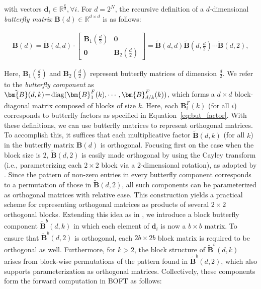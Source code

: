 with vectors $\bm{d}_i\in\mathbb{R}^{\frac{k}{2}}, \forall i$. For $d=2^N$, the recursive definition of a $d$-dimensional \emph{butterfly matrix} $\bm{B}(d)\in\mathbb{R}^{d\times d}$ is as follows:

\begin{equation}
\begin{aligned}
    \!\!\bm{B}(d)=\tilde{\bm{B}}(d,d)\!\cdot\!\begin{bmatrix}
    \bm{B}_1(\frac{d}{2})\!\!\!\!\! & \bm{0} \\
    \bm{0}\!\!\!\!\! &\bm{B}_2(\frac{d}{2})
    \end{bmatrix}= \tilde{\bm{B}}(d,d)\tilde{\bm{B}}(d,\frac{d}{2})\cdots\tilde{\bm{B}}(d,2),
\end{aligned}
\end{equation}

Here, $\bm{B}_1(\frac{d}{2})$ and $\bm{B}_2(\frac{d}{2})$ represent butterfly matrices of dimension $\frac{d}{2}$. We refer to the \emph{butterfly component} as $\thickmuskip=2mu \medmuskip=2mu \tilde{\bm{B}}(d,k)=\text{diag}(\bm{B}^F_1(k),\cdots,\bm{B}^F_{d/k}(k))$, which forms a $d\times d$ block-diagonal matrix composed of blocks of size $k$. Here, each $\bm{B}^F_i(k)$ (for all $i$) corresponds to butterfly factors as specified in Equation~\ref{eq:but_factor}. With these definitions, we can use butterfly matrices to represent orthogonal matrices. To accomplish this, it suffices that each multiplicative factor $\tilde{\bm{B}}(d,k)$ (for all $k$) in the butterfly matrix $\bm{B}(d)$ is orthogonal. Focusing first on the case when the block size is $2$, $\tilde{\bm{B}}(d,2)$ is easily made orthogonal by using the Cayley transform (i.e., parameterizing each $2\times 2$ block via a $2$-dimensional rotation), as adopted by \cite{liu2021orthogonal, qiu2023controlling}. Since the pattern of non-zero entries in every butterfly component corresponds to a permutation of those in $\tilde{\bm{B}}(d,2)$, all such components can be parameterized as orthogonal matrices with relative ease. This construction yields a practical scheme for representing orthogonal matrices as products of several $2\times 2$ orthogonal blocks. Extending this idea as in \cite{chen2022pixelated}, we introduce a block butterfly component $\tilde{\bm{B}}^b(d,k)$ in which each element of $\bm{d}_i$ is now a $b\times b$ matrix. To ensure that $\tilde{\bm{B}}^b(d,2)$ is orthogonal, each $2b\times 2b$ block matrix is required to be orthogonal as well. Furthermore, for $k>2$, the block structure of $\tilde{\bm{B}}^b(d,k)$ arises from block-wise permutations of the pattern found in $\tilde{\bm{B}}^b(d,2)$, which also supports parameterization as orthogonal matrices. Collectively, these components form the forward computation in BOFT as follows:

